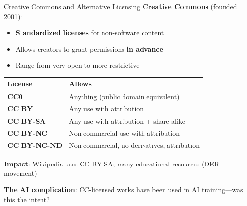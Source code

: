\documentclass[aspectratio=169]{beamer}
\begin{document}
\begin{frame}{Creative Commons and Alternative Licensing}
\textbf{Creative Commons} (founded 2001):
\begin{itemize}
    \item \textbf{Standardized licenses} for non-software content
    \item Allows creators to grant permissions \textbf{in advance}
    \item Range from very open to more restrictive
\end{itemize}

\vspace{0.2cm}
\begin{table}[h]
\centering
\small
\begin{tabular}{>{\bfseries}l p{7cm}}
\toprule
License & Allows \\
\midrule
CC0 & Anything (public domain equivalent) \\
CC BY & Any use with attribution \\
CC BY-SA & Any use with attribution + share alike \\
CC BY-NC & Non-commercial use with attribution \\
CC BY-NC-ND & Non-commercial, no derivatives, attribution \\
\bottomrule
\end{tabular}
\end{table}

\vspace{0.2cm}
\textbf{Impact}: Wikipedia uses CC BY-SA; many educational resources (OER movement)

\textbf{The AI complication}: CC-licensed works have been used in AI training---was this the intent?
\end{frame}

\end{document}
